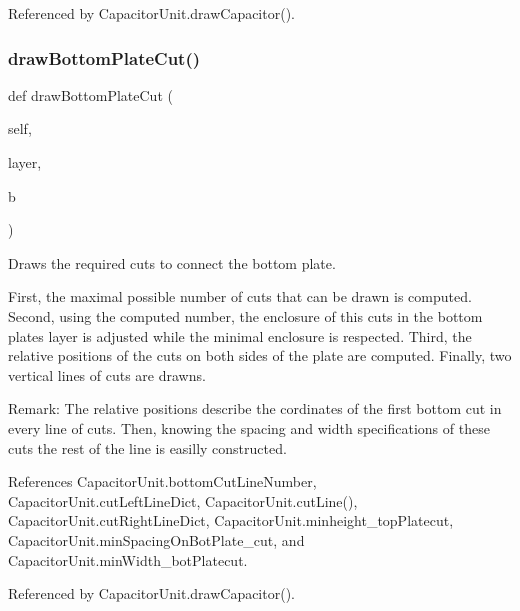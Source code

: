 Referenced by Capacitor\+Unit.\+draw\+Capacitor().

\mbox{\label{classpython_1_1capacitorunit_1_1CapacitorUnit_a727010b51f0670072cfe620aa0fb9973}} 
\subsubsection{\texorpdfstring{draw\+Bottom\+Plate\+Cut()}{drawBottomPlateCut()}}
{\footnotesize\ttfamily def draw\+Bottom\+Plate\+Cut (\begin{DoxyParamCaption}\item[{}]{self,  }\item[{}]{layer,  }\item[{}]{b }\end{DoxyParamCaption})}



Draws the required cuts to connect the bottom plate. 

First, the maximal possible number of cuts that can be drawn is computed. Second, using the computed number, the enclosure of this cuts in the bottom plate\textquotesingle{}s layer is adjusted while the minimal enclosure is respected. Third, the relative positions of the cuts on both sides of the plate are computed. Finally, two vertical lines of cuts are drawns. \begin{DoxyParagraph}{Remark\+: The relative positions describe the cordinates of the first bottom cut in every line of cuts. Then, knowing the spacing and width specifications of these cuts the rest of the line is easilly constructed. }

\end{DoxyParagraph}


References Capacitor\+Unit.\+bottom\+Cut\+Line\+Number, Capacitor\+Unit.\+cut\+Left\+Line\+Dict, Capacitor\+Unit.\+cut\+Line(), Capacitor\+Unit.\+cut\+Right\+Line\+Dict, Capacitor\+Unit.\+minheight\+\_\+top\+Platecut, Capacitor\+Unit.\+min\+Spacing\+On\+Bot\+Plate\+\_\+cut, and Capacitor\+Unit.\+min\+Width\+\_\+bot\+Platecut.



Referenced by Capacitor\+Unit.\+draw\+Capacitor().

